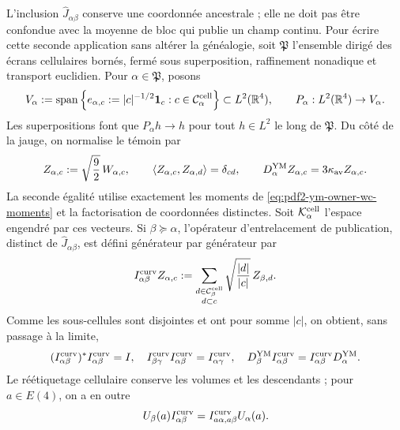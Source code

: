 L’inclusion $\widehat J_{\alpha\beta}$ conserve une coordonnée ancestrale ; elle ne doit pas
être confondue avec la moyenne de bloc qui publie un champ continu. Pour écrire
cette seconde application sans altérer la généalogie, soit $\mathfrak P$ l’ensemble dirigé
des écrans cellulaires bornés, fermé sous superposition, raffinement nonadique et
transport euclidien. Pour $\alpha\in\mathfrak P$, posons
\begin{equation}\label{eq:pdf2-ym-owner-cell-step-space}
 V_\alpha:=\operatorname{span}\left\{
 e_{\alpha,c}:=|c|^{-1/2}\mathbf1_c:
 c\in\mathcal C_\alpha^{\rm cell}\right\}
 \subset L^2(\mathbb R^4),
 \qquad P_\alpha:L^2(\mathbb R^4)\to V_\alpha.
\end{equation}
Les superpositions font que $P_\alpha h\to h$ pour tout $h\in L^2$ le long de
$\mathfrak P$. Du côté de la jauge, on normalise le témoin par
\begin{equation}\label{eq:pdf2-ym-owner-normalized-cell-witness}
 Z_{\alpha,c}:=\sqrt{\frac92}\,W_{\alpha,c},
 \qquad
 \langle Z_{\alpha,c},Z_{\alpha,d}\rangle=\delta_{cd},
 \qquad
 D_\alpha^{\rm YM}Z_{\alpha,c}=3\kappa_{\rm av}Z_{\alpha,c}.
\end{equation}
La seconde égalité utilise exactement les moments de \eqref{eq:pdf2-ym-owner-wc-moments} et la factorisation de coordonnées distinctes. Soit $\mathcal K_\alpha^{\rm cell}$ l'espace engendré par ces vecteurs. Si $\beta\succeq\alpha$, l'opérateur d'entrelacement de publication, distinct de $\widehat J_{\alpha\beta}$, est défini générateur par générateur par
\begin{equation}\label{eq:pdf2-ym-owner-block-intertwiner}
 I_{\alpha\beta}^{\rm curv}Z_{\alpha,c}
 :=\sum_{\substack{d\in\mathcal C_\beta^{\rm cell}\\d\subset c}}
       \sqrt{\frac{|d|}{|c|}}\,Z_{\beta,d}.
\end{equation}
Comme les sous-cellules sont disjointes et ont pour somme $|c|$, on obtient, sans passage à la limite,
\begin{equation}\label{eq:pdf2-ym-owner-block-intertwiner-identities}
 (I_{\alpha\beta}^{\rm curv})^*I_{\alpha\beta}^{\rm curv}=I,
 \quad
 I_{\beta\gamma}^{\rm curv}I_{\alpha\beta}^{\rm curv}
 =I_{\alpha\gamma}^{\rm curv},
 \quad
 D_\beta^{\rm YM}I_{\alpha\beta}^{\rm curv}
 =I_{\alpha\beta}^{\rm curv}D_\alpha^{\rm YM}.
\end{equation}
Le réétiquetage cellulaire conserve les volumes et les descendants ; pour $a\in E(4)$, on a en outre
\begin{equation}\label{eq:pdf2-ym-owner-block-e4-naturality}
 U_\beta(a)I_{\alpha\beta}^{\rm curv}
 =I_{a\alpha,a\beta}^{\rm curv}U_\alpha(a).
\end{equation}

